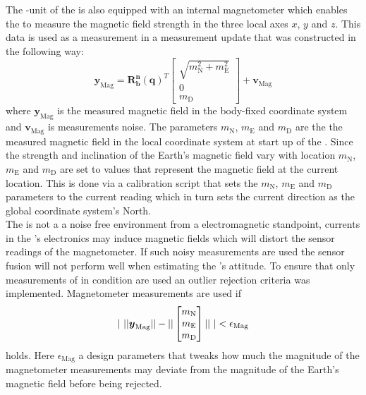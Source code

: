 The \abbrIO-unit of the \abbrROV is also equipped with an internal magnetometer which enables the \abbrROV to measure the magnetic field strength in the three local axes $x$, $y$ and $z$. This data is used as a measurement in a measurement update that was constructed in the following way:
\begin{equation}
\boldsymbol{y}_{\text{Mag}} = 
    \boldsymbol{R^n_b}(\boldsymbol{q})^T
    \begin{bmatrix}
        \sqrt{m_\text{N}^2 +m_\text{E}^2}\\
        0\\
        m_\text{D}
    \end{bmatrix}
    + \boldsymbol{v}_{\text{Mag}}
\end{equation}
where $\boldsymbol{y}_{\text{Mag}}$ is the measured magnetic field in the body-fixed coordinate system and $\boldsymbol{v}_{\text{Mag}}$ is measurements noise. The parameters $m_\text{N}$, $m_\text{E}$ and $m_\text{D}$ are the the measured magnetic field in the local coordinate system at start up of the \abbrROV. Since the strength and inclination of the Earth's magnetic field vary with location $m_\text{N}$, $m_\text{E}$ and $m_\text{D}$ are set to values that represent the magnetic field at the current location. This is done via a calibration script that sets the $m_\text{N}$, $m_\text{E}$ and $m_\text{D}$ parameters to the current reading which in turn sets the current direction as the global coordinate system's North.\\
The \abbrROV is not a a noise free environment from a electromagnetic standpoint, currents in the \abbrROV's electronics may induce magnetic fields which will distort the sensor readings of the magnetometer. If such noisy measurements are used the sensor fusion will not perform well when estimating the \abbrROV's attitude. To ensure that only measurements of in condition are used an outlier rejection criteria was implemented. Magnetometer measurements are used if 
\begin{equation}
        |~||
\boldsymbol{y}_{\text{Mag}}||
    -
    ||
    \begin{bmatrix}
        m_\text{N}\\
        m_\text{E}\\
        m_\text{D}
    \end{bmatrix}||
     ~| < \epsilon_{\text{Mag}}
\end{equation}
holds. Here $\epsilon_{\text{Mag}}$ a design parameters that tweaks how much the magnitude of the magnetometer measurements may deviate from the magnitude of the Earth's magnetic field before being rejected.

